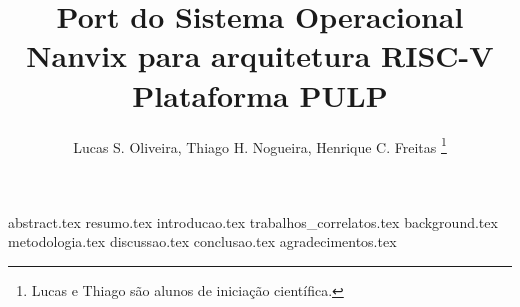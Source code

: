 \documentclass[12pt]{article}
\title{Port do Sistema Operacional Nanvix para arquitetura RISC-V Plataforma PULP}
\author{
       {Lucas S. Oliveira, Thiago H. Nogueira, Henrique C. Freitas}
       \thanks{Lucas e Thiago são alunos de iniciação científica.}
}
\begin{document}
    \maketitle

    {abstract.tex} %
    {resumo.tex} %
    {introducao.tex} %
    {trabalhos_correlatos.tex} %
    {background.tex} %
    {metodologia.tex} %
    {discussao.tex} %
    {conclusao.tex} %
    {agradecimentos.tex} %
    
    
    
\end{document}

